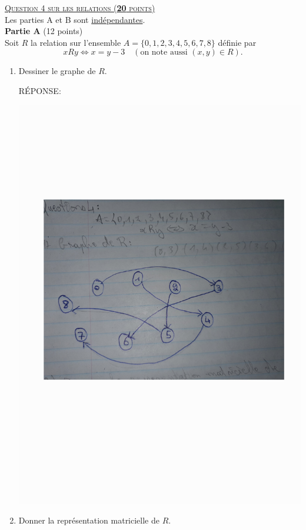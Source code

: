 %
%

{\textsc{\underline{Question 4 sur les relations  (\textbf{20} points)}}}\\

Les parties A et B sont \underline{ind\'ependantes}.\\

\textbf{Partie A} (12 points)\\

 Soit $R$ la relation sur l'ensemble $A=\{0, 1,2,3,4,5,6,7,8 \}$ d\'efinie par 
$$xRy \Longleftrightarrow x = y - 3 \quad(\mbox{on note aussi }(x,y) \in R). $$ 

\begin{enumerate}[\bf 1.]

\item{} Dessiner le graphe de $R$.
\begin{framed}

R\'EPONSE:
\vspace{-.75cm}
\begin{center}
    \includegraphics[width=3.5 in]{Figures/Graphe1.pdf} 
\end{center}
\vspace{-.75cm}
\end{framed}
\item{} Donner la représentation matricielle de $R$.
\begin{framed}


\end{framed}
\end{enumerate}
